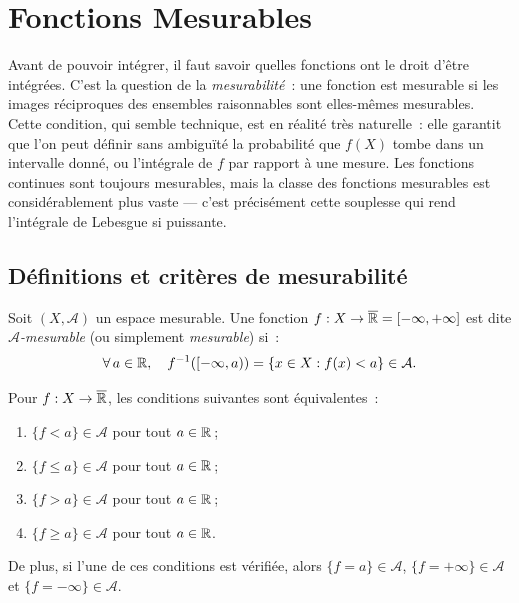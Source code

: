 \chapter{Fonctions Mesurables}
\label{ch:fonctions_mesurables}

Avant de pouvoir int\'egrer, il faut savoir quelles fonctions ont le droit d'\^etre int\'egr\'ees. C'est la question de la \emph{mesurabilit\'e}~: une fonction est mesurable si les images r\'eciproques des ensembles \og raisonnables \fg sont elles-m\^emes mesurables. Cette condition, qui semble technique, est en r\'ealit\'e tr\`es naturelle~: elle garantit que l'on peut d\'efinir sans ambigu\"it\'e la probabilit\'e que $f(X)$ tombe dans un intervalle donn\'e, ou l'int\'egrale de $f$ par rapport \`a une mesure. Les fonctions continues sont toujours mesurables, mais la classe des fonctions mesurables est consid\'erablement plus vaste --- c'est pr\'ecis\'ement cette souplesse qui rend l'int\'egrale de Lebesgue si puissante.

\section{D\'efinitions et crit\`eres de mesurabilit\'e}

\begin{definition}
Soit $(X, \mathcal{A})$ un espace mesurable. Une fonction
$f : X \to \overline{\mathbb{R}} = [-\infty, +\infty]$ est dite
\emph{$\mathcal{A}$-mesurable} (ou simplement \emph{mesurable}) si~:
\[
\forall\, a \in \mathbb{R}, \quad f^{-1}([-\infty, a)) = \{x \in X : f(x) < a\} \in
\mathcal{A}.
\]
\end{definition}

\begin{proposition}
\label{prop:criteres_mesurabilite}
Pour $f : X \to \overline{\mathbb{R}}$, les conditions suivantes sont \'equivalentes~:
\begin{enumerate}
    \item $\{f < a\} \in \mathcal{A}$ pour tout $a \in \mathbb{R}$\,;
    \item $\{f \leq a\} \in \mathcal{A}$ pour tout $a \in \mathbb{R}$\,;
    \item $\{f > a\} \in \mathcal{A}$ pour tout $a \in \mathbb{R}$\,;
    \item $\{f \geq a\} \in \mathcal{A}$ pour tout $a \in \mathbb{R}$.
\end{enumerate}
De plus, si l'une de ces conditions est v\'erifi\'ee, alors
$\{f = a\} \in \mathcal{A}$, $\{f = +\infty\} \in \mathcal{A}$ et
$\{f = -\infty\} \in \mathcal{A}$.
\end{proposition}

